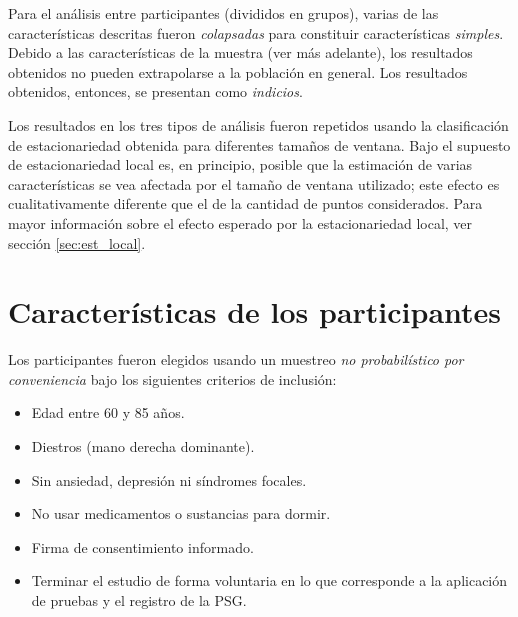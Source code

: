 \documentclass[12pt,letterpaper]{book}
\begin{document}
Para el análisis entre participantes (divididos en grupos), varias de las características descritas fueron \textit{colapsadas} para constituir características \textit{simples}. 
%
Debido a las características de la muestra (ver más adelante), los resultados obtenidos no pueden extrapolarse a la población en general.
%
Los resultados obtenidos, entonces, se presentan como \textit{indicios}.

Los resultados en los tres tipos de análisis fueron repetidos usando la clasificación de estacionariedad obtenida para diferentes tamaños de ventana.
%
Bajo el supuesto de estacionariedad local es, en principio, posible que la estimación de varias características se vea afectada por el tamaño de ventana utilizado; este efecto es cualitativamente diferente que el de la cantidad de puntos considerados.
%
Para mayor información sobre el efecto esperado por la estacionariedad local, ver sección \ref{sec:est_local}.


\section{Características de los participantes}

Los participantes fueron elegidos usando un muestreo \textit{no probabilístico por conveniencia} bajo los siguientes criterios de inclusión:
\begin{itemize}
\item Edad entre 60 y 85 años.
\item Diestros (mano derecha dominante).
\item Sin ansiedad, depresión ni síndromes focales.
\item No usar medicamentos o sustancias para dormir.
\item Firma de consentimiento informado.
\item Terminar el estudio de forma voluntaria en lo que corresponde a la aplicación de pruebas y el registro de la PSG.
\end{itemize}
\end{document}
